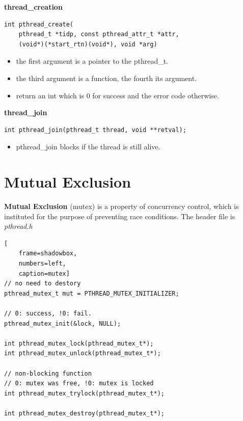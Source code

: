\documentclass{article}
\begin{document}
\textbf{thread\_creation}

\begin{lstlisting}
int pthread_create(
    pthread_t *tidp, const pthread_attr_t *attr,
    (void*)(*start_rtn)(void*), void *arg)
\end{lstlisting}

\begin{itemize}
    \item the first argument is a pointer to the pthread\_t.
    \item the third argument is a function, the fourth its argument.
    \item return an int which is 0 for success and the error code otherwise.
\end{itemize}

\noindent \textbf{thread\_join}

\begin{lstlisting}
int pthread_join(pthread_t thread, void **retval);
\end{lstlisting}

\begin{itemize}
    \item pthread\_join blocks if the thread is still alive.
\end{itemize}



\section{Mutual Exclusion}

\textbf{Mutual Exclusion} (mutex) is a property of concurrency control, which is instituted for the purpose of preventing race conditions. The header file is \textit{pthread.h}

\begin{lstlisting}[
    frame=shadowbox,
    numbers=left,
    caption=mutex]
// no need to destory
pthread_mutex_t mut = PTHREAD_MUTEX_INITIALIZER;

// 0: success, !0: fail.
pthread_mutex_init(&lock, NULL);

int pthread_mutex_lock(pthread_mutex_t*);
int pthread_mutex_unlock(pthread_mutex_t*);

// non-blocking function
// 0: mutex was free, !0: mutex is locked
int pthread_mutex_trylock(pthread_mutex_t*);

int pthread_mutex_destroy(pthread_mutex_t*);
\end{lstlisting}
\end{document}
